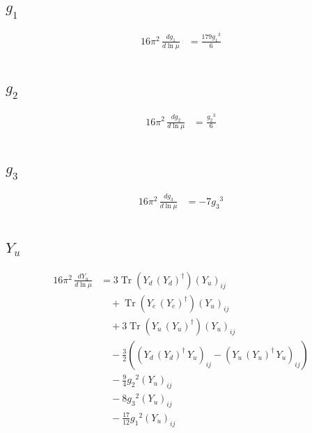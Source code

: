 \documentclass[10pt,a4paper]{article}
\begin{document}
\subsection*{$g_1$}
\begin{align*}
16\pi^2\,\frac{d g_1}{d\ln\mu} &=\frac{179 {g_1}^3}{6} \\
\end{align*}
\subsection*{$g_2$}
\begin{align*}
16\pi^2\,\frac{d g_2}{d\ln\mu} &=\frac{{g_2}^3}{6} \\
\end{align*}
\subsection*{$g_3$}
\begin{align*}
16\pi^2\,\frac{d g_3}{d\ln\mu} &=-7 {g_3}^3 \\
\end{align*}
\subsection*{$Y_u$}
\begin{align*}
16\pi^2\,\frac{d Y_u}{d\ln\mu} &=3 \operatorname{Tr}\!\left({Y_d}\,\left({Y_d}\right)^{\dagger}\right) \left({Y_u}\right)_{ij} \\
&\quad +\operatorname{Tr}\!\left({Y_e}\,\left({Y_e}\right)^{\dagger}\right) \left({Y_u}\right)_{ij} \\
&\quad +3 \operatorname{Tr}\!\left({Y_u}\,\left({Y_u}\right)^{\dagger}\right) \left({Y_u}\right)_{ij} \\
&\quad -\frac{3}{2} (\left({Y_d}\,\left({Y_d}\right)^{\dagger}\,{Y_u}\right)_{ij}-\left({Y_u}\,\left({Y_u}\right)^{\dagger}\,{Y_u}\right)_{ij}) \\
&\quad -\frac{9}{4} {g_2}^2 \left({Y_u}\right)_{ij} \\
&\quad -8 {g_3}^2 \left({Y_u}\right)_{ij} \\
&\quad -\frac{17}{12} {g_1}^2 \left({Y_u}\right)_{ij} \\
\end{align*}
\end{document}
